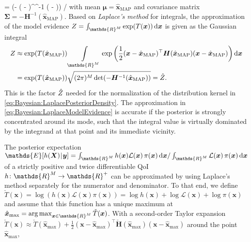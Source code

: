 = \exp(- ( - \bm{\mu})^\top \bm{\Sigma}^{-1} ( - \bm{\mu})) / \sqrt{(2\pi)^\dimParam \det(\bm{\Sigma})}\)
with mean \(\bm{\mu} = \hat{\bm{x}}_{\mathrm{MAP}}\) and covariance matrix \(\bm{\Sigma} = -\bm{H}^{-1}(\hat{\bm{x}}_{\mathrm{MAP}})\).
Based on \emph{Laplace's method} for integrals, the approximation of the model evidence \(\scale = \int_{\mathds{R}^\dimParam} \exp(T(\bm{x})) \, \mathrm{d} \bm{x}\) is given as the Gaussian integral
\begin{equation} \label{eq:Bayesian:LaplaceModelEvidence}
  \begin{aligned}
    \scale &\approx \exp(T(\hat{\bm{x}}_{\mathrm{MAP}}))
    \int\limits_{\mathds{R}^\dimParam}
    \exp \left( \frac{1}{2} (\bm{x} - \hat{\bm{x}}_{\mathrm{MAP}})^\top \bm{H}(\hat{\bm{x}}_{\mathrm{MAP}}) (\bm{x} - \hat{\bm{x}}_{\mathrm{MAP}}) \right) \mathrm{d} \bm{x} \\
    &= \exp(T(\hat{\bm{x}}_{\mathrm{MAP}})) \sqrt{(2\pi)^\dimParam \det(-\bm{H}^{-1}(\hat{\bm{x}}_{\mathrm{MAP}}))} = \hat{\scale}.
  \end{aligned}
\end{equation}
This is the factor \(\hat{Z}\) needed for the normalization of the distribution kernel in \cref{eq:Bayesian:LaplacePosteriorDensity}.
The approximation in \cref{eq:Bayesian:LaplaceModelEvidence} is accurate if the posterior is strongly concentrated around its mode,
such that the integral value is virtually dominated by the integrand at that point and its immediate vicinity.
\par %
The posterior expectation \(\mathds{E}[h(\bm{X}) \cond \bm{y}] = \int_{\mathds{R}^\dimParam} h(\bm{x}) \mathcal{L}(\bm{x}) \, \pi(\bm{x}) \, \mathrm{d} \bm{x}
/ \int_{\mathds{R}^\dimParam} \mathcal{L}(\bm{x}) \, \pi(\bm{x}) \, \mathrm{d} \bm{x}\) of a strictly positive and twice differentiable QoI
\(h \colon \mathds{R}^\dimParam \rightarrow \mathds{R}^{+}\) can be approximated by using Laplace's method separately for the numerator and denominator.
To that end, we define \(\check{T}(\bm{x}) = \log(h(\bm{x}) \mathcal{L}(\bm{x}) \pi(\bm{x})) = \log h(\bm{x}) + \log \mathcal{L}(\bm{x}) + \log \pi(\bm{x})\)
and assume that this function has a unique maximum at \(\hat{\bm{x}}_{\mathrm{max}} = \operatorname*{arg\,max}_{\bm{x} \in \mathds{R}^\dimParam} \check{T}(\bm{x})\).
With a second-order Taylor expansion \(\check{T}(\bm{x}) \approx \check{T}(\hat{\bm{x}}_{\mathrm{max}})+ \frac{1}{2} (\bm{x} - \hat{\bm{x}}_{\mathrm{max}})^\top
\check{\bm{H}}(\hat{\bm{x}}_{\mathrm{max}}) (\bm{x} - \hat{\bm{x}}_{\mathrm{max}})\) around the point \(\hat{\bm{x}}_{\mathrm{max}}\),
